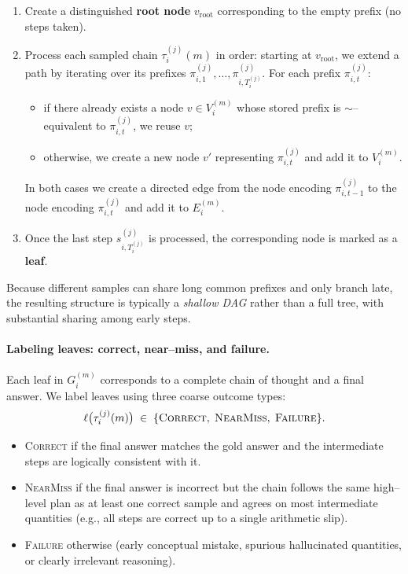 \begin{enumerate}[leftmargin=1.5em]
  \item Create a distinguished \textbf{root node} $v_{\mathrm{root}}$
  corresponding to the empty prefix (no steps taken).

  \item Process each sampled chain $\tau_i^{(j)}(m)$ in order:
  starting at $v_{\mathrm{root}}$, we extend a path by iterating over
  its prefixes $\pi_{i,1}^{(j)}, \dots, \pi_{i,T_i^{(j)}}^{(j)}$.
  For each prefix $\pi_{i,t}^{(j)}$:
  \begin{itemize}
    \item if there already exists a node
    $v \in V_i^{(m)}$ whose stored prefix is
    $\sim$--equivalent to $\pi_{i,t}^{(j)}$, we reuse $v$;
    \item otherwise, we create a new node $v'$ representing
    $\pi_{i,t}^{(j)}$ and add it to $V_i^{(m)}$.
  \end{itemize}
  In both cases we create a directed edge from the node encoding
  $\pi_{i,t-1}^{(j)}$ to the node encoding $\pi_{i,t}^{(j)}$ and add it
  to $E_i^{(m)}$.

  \item Once the last step $s_{i,T_{i}^{(j)}}^{(j)}$ is processed, the
  corresponding node is marked as a \textbf{leaf}.
\end{enumerate}

Because different samples can share long common prefixes and only branch
late, the resulting structure is typically a \emph{shallow DAG} rather
than a full tree, with substantial sharing among early steps.

\paragraph{Labeling leaves: correct, near--miss, and failure.}
Each leaf in $G_i^{(m)}$ corresponds to a complete chain of thought and
a final answer.
We label leaves using three coarse outcome types:
\[
  \ell\bigl(\tau_i^{(j)}(m)\bigr)
  \;\in\;
  \{\textsc{Correct},\;\textsc{NearMiss},\;\textsc{Failure}\}.
\]

\begin{itemize}
  \item \textsc{Correct} if the final answer matches the gold answer and
  the intermediate steps are logically consistent with it.

  \item \textsc{NearMiss} if the final answer is incorrect but the
  chain follows the same high--level plan as at least one correct
  sample and agrees on most intermediate quantities (e.g., all steps
  are correct up to a single arithmetic slip).

  \item \textsc{Failure} otherwise (early conceptual mistake, spurious
  hallucinated quantities, or clearly irrelevant reasoning).
\end{itemize}

